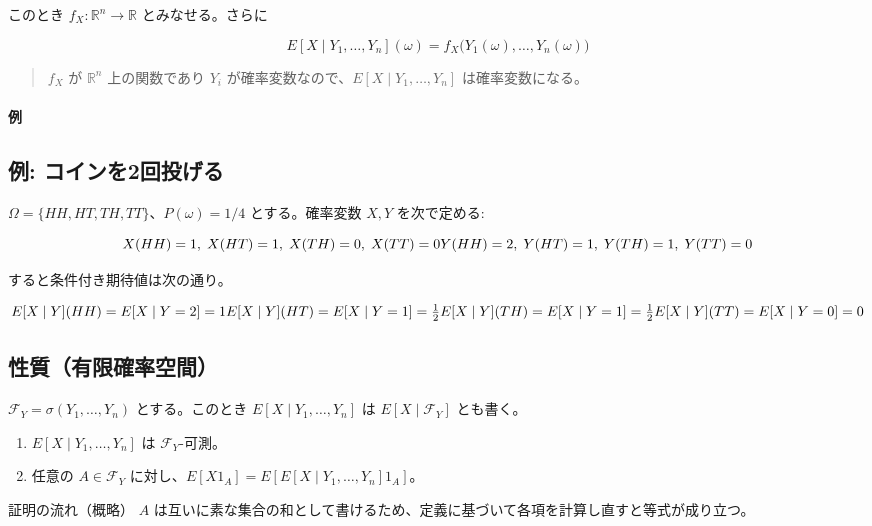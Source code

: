 \documentclass[uplatex,dvipdfmx,11pt,a4paper,openany]{bxjsbook}
\newenvironment{noteblock}{\begin{quote}\color{black!72}\small}{\end{quote}}
\begin{document}
このとき $f_X : \mathbb{R}^n \to \mathbb{R}$ とみなせる。さらに

\[
            E[X \mid Y_1,\ldots,Y_n](\omega) = f_X\bigl(Y_1(\omega),\ldots,Y_n(\omega)\bigr)
          \]

\begin{noteblock}
$f_X$ が $\mathbb{R}^n$ 上の関数であり $Y_i$ が確率変数なので、$E[X \mid Y_1,\ldots,Y_n]$ は確率変数になる。
\end{noteblock}


\paragraph{例}
\subsection{例: コインを2回投げる}
$\Omega=\{HH, HT, TH, TT\}$、$P(\omega)=1/4$ とする。確率変数 $X, Y$ を次で定める:

\[
            X(HH)=1,\; X(HT)=1,\; X(TH)=0,\; X(TT)=0 \\
            Y(HH)=2,\; Y(HT)=1,\; Y(TH)=1,\; Y(TT)=0
          \]

すると条件付き期待値は次の通り。

\[
            E[X \mid Y](HH)=E[X \mid Y=2]=1 \\
            E[X \mid Y](HT)=E[X \mid Y=1]=\tfrac{1}{2} \\
            E[X \mid Y](TH)=E[X \mid Y=1]=\tfrac{1}{2} \\
            E[X \mid Y](TT)=E[X \mid Y=0]=0
          \]


\subsection{性質（有限確率空間）}
$\mathcal{F}_Y = \sigma(Y_1,\ldots,Y_n)$ とする。このとき $E[X \mid Y_1,\ldots,Y_n]$ は $E[X \mid \mathcal{F}_Y]$ とも書く。

\begin{enumerate}
\item $E[X \mid Y_1,\ldots,Y_n]$ は $\mathcal{F}_Y$-可測。
\item 任意の $A \in \mathcal{F}_Y$ に対し、$E[X 1_A] = E[E[X \mid Y_1,\ldots,Y_n] 1_A]$。
\end{enumerate}

\begin{detailblock}{証明の流れ（概略）}
$A$ は互いに素な集合の和として書けるため、定義に基づいて各項を計算し直すと等式が成り立つ。

\end{detailblock}
\end{document}
